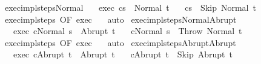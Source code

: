 \begin{isabellebody}
\isamarkupfalse%
%
\endisatagproof
{\isafoldproof}%
%
\isadelimproof
\isanewline
%
\endisadelimproof
\isanewline
{}\isamarkupfalse%
\ exec{\isacharunderscore}impl{\isacharunderscore}steps{\isacharunderscore}Normal{\isacharcolon}\isanewline
\ \ \ exec{\isacharcolon}\ {\isachardoublequoteopen}{\isasymGamma}{\isasymturnstile}{\isasymlangle}c{\isacharcomma}s{\isasymrangle}\ {\isasymRightarrow}\ Normal\ t{\isachardoublequoteclose}\isanewline
\ \ \ {\isachardoublequoteopen}{\isasymGamma}{\isasymturnstile}{\isacharparenleft}c{\isacharcomma}s{\isacharparenright}\ {\isasymrightarrow}\isactrlsup {\isacharasterisk}\ {\isacharparenleft}Skip{\isacharcomma}\ Normal\ t{\isacharparenright}{\isachardoublequoteclose}\isanewline
%
\isadelimproof
%
\endisadelimproof
%
\isatagproof
{}\isamarkupfalse%
\ exec{\isacharunderscore}impl{\isacharunderscore}steps\ {\isacharbrackleft}OF\ exec{\isacharbrackright}\ \ \isanewline
{}\isamarkupfalse%
\ auto%
\endisatagproof
{\isafoldproof}%
%
\isadelimproof
\isanewline
%
\endisadelimproof
\isanewline
{}\isamarkupfalse%
\ exec{\isacharunderscore}impl{\isacharunderscore}steps{\isacharunderscore}Normal{\isacharunderscore}Abrupt{\isacharcolon}\isanewline
\ \ \ exec{\isacharcolon}\ {\isachardoublequoteopen}{\isasymGamma}{\isasymturnstile}{\isasymlangle}c{\isacharcomma}Normal\ s{\isasymrangle}\ {\isasymRightarrow}\ Abrupt\ t{\isachardoublequoteclose}\isanewline
\ \ \ {\isachardoublequoteopen}{\isasymGamma}{\isasymturnstile}{\isacharparenleft}c{\isacharcomma}Normal\ s{\isacharparenright}\ {\isasymrightarrow}\isactrlsup {\isacharasterisk}\ {\isacharparenleft}Throw{\isacharcomma}\ Normal\ t{\isacharparenright}{\isachardoublequoteclose}\isanewline
%
\isadelimproof
%
\endisadelimproof
%
\isatagproof
{}\isamarkupfalse%
\ exec{\isacharunderscore}impl{\isacharunderscore}steps\ {\isacharbrackleft}OF\ exec{\isacharbrackright}\ \ \isanewline
{}\isamarkupfalse%
\ auto%
\endisatagproof
{\isafoldproof}%
%
\isadelimproof
\isanewline
%
\endisadelimproof
\isanewline
{}\isamarkupfalse%
\ exec{\isacharunderscore}impl{\isacharunderscore}steps{\isacharunderscore}Abrupt{\isacharunderscore}Abrupt{\isacharcolon}\isanewline
\ \ \ exec{\isacharcolon}\ {\isachardoublequoteopen}{\isasymGamma}{\isasymturnstile}{\isasymlangle}c{\isacharcomma}Abrupt\ t{\isasymrangle}\ {\isasymRightarrow}\ Abrupt\ t{\isachardoublequoteclose}\isanewline
\ \ \ {\isachardoublequoteopen}{\isasymGamma}{\isasymturnstile}{\isacharparenleft}c{\isacharcomma}Abrupt\ t{\isacharparenright}\ {\isasymrightarrow}\isactrlsup {\isacharasterisk}\ {\isacharparenleft}Skip{\isacharcomma}\ Abrupt\ t{\isacharparenright}{\isachardoublequoteclose}\isanewline

\end{isabellebody}
